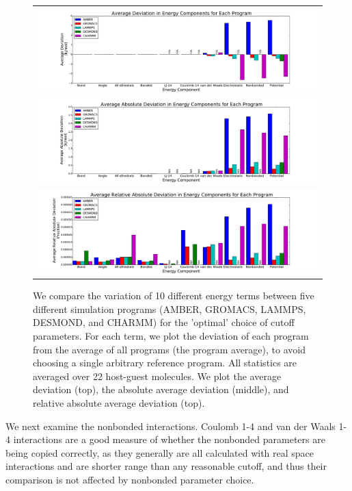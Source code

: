 \begin{figure}[h]
\begin{tabular}{c}
\includegraphics[width=\textwidth]{AverageIdealSettings.pdf} \\  
\includegraphics[width=\textwidth]{AverageAbsoluteIdealSettings.pdf} \\  
\includegraphics[width=\textwidth]{AverageRelativeAbsoluteIdealSettings.pdf}
\end{tabular}
\caption{We compare the variation of 10 different energy terms between
  five different simulation programs (AMBER, GROMACS, LAMMPS, DESMOND,
  and CHARMM) for the 'optimal' choice of cutoff parameters. For each
  term, we plot the deviation of each program from the average of all
  programs (the program average), to avoid choosing a single arbitrary
  reference program. All statistics are averaged over 22 host-guest
  molecules. We plot the average deviation (top), the absolute average
  deviation (middle), and relative absolute average deviation (top).
\label{fig:mainfig}}
\end{figure}

We next examine the nonbonded interactions. Coulomb 1-4 and van der
Waals 1-4 interactions are a good measure of whether the nonbonded
parameters are being copied correctly, as they generally are all
calculated with real space interactions and are shorter range than any
reasonable cutoff, and thus their comparison is not affected by
nonbonded parameter choice.

